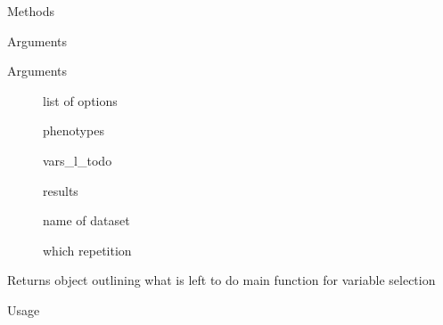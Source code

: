 \documentclass[letterpaper]{book}
\begin{document}
\begin{Section}{Methods}
\begin{SubSection}{}
\begin{SubSubSection}{Arguments}
\begin{description}
\end{description}



\end{SubSubSection}

\end{SubSection}




\hypertarget{method-analysisEnv-savePvalsAndNextVars}{}
%
\begin{SubSection}{}
%

%
\begin{SubSubSection}{Arguments}

\begin{description}

\item[] list of options
\item[] phenotypes
\item[] vars\_l\_todo
\item[] results
\item[] name of dataset
\item[] which repetition

\end{description}



\end{SubSubSection}

%
\begin{SubSubSection}{Returns}
object outlining what is left to do
main function for variable selection

\end{SubSubSection}

\end{SubSection}




\hypertarget{method-analysisEnv-select}{}
%
\begin{SubSection}{}
%
\begin{SubSubSection}{Usage}


\end{SubSubSection}
\end{SubSection}
\end{Section}
\end{document}
